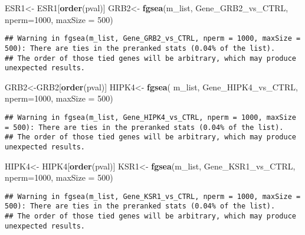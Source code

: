 \documentclass[]{article}
\newenvironment{Shaded}{\begin{snugshade}}{\end{snugshade}}
\newcommand{\KeywordTok}[1]{\textcolor[rgb]{0.13,0.29,0.53}{\textbf{#1}}}
\newcommand{\DataTypeTok}[1]{\textcolor[rgb]{0.13,0.29,0.53}{#1}}
\newcommand{\DecValTok}[1]{\textcolor[rgb]{0.00,0.00,0.81}{#1}}
\newcommand{\StringTok}[1]{\textcolor[rgb]{0.31,0.60,0.02}{#1}}
\newcommand{\NormalTok}[1]{#1}
\begin{document}
\begin{Shaded}
\begin{Highlighting}[]
\NormalTok{ESR1<-}\StringTok{ }\NormalTok{ESR1[}\KeywordTok{order}\NormalTok{(pval)]}
\NormalTok{GRB2<-}\StringTok{ }\KeywordTok{fgsea}\NormalTok{(m_list, Gene_GRB2_vs_CTRL, }\DataTypeTok{nperm=}\DecValTok{1000}\NormalTok{, }\DataTypeTok{maxSize =} \DecValTok{500}\NormalTok{)}
\end{Highlighting}
\end{Shaded}

\begin{verbatim}
## Warning in fgsea(m_list, Gene_GRB2_vs_CTRL, nperm = 1000, maxSize = 500): There are ties in the preranked stats (0.04% of the list).
## The order of those tied genes will be arbitrary, which may produce unexpected results.
\end{verbatim}

\begin{Shaded}
\begin{Highlighting}[]
\NormalTok{GRB2<-GRB2[}\KeywordTok{order}\NormalTok{(pval)]}
\NormalTok{HIPK4<-}\StringTok{ }\KeywordTok{fgsea}\NormalTok{( m_list, Gene_HIPK4_vs_CTRL, }\DataTypeTok{nperm=}\DecValTok{1000}\NormalTok{, }\DataTypeTok{maxSize =} \DecValTok{500}\NormalTok{)}
\end{Highlighting}
\end{Shaded}

\begin{verbatim}
## Warning in fgsea(m_list, Gene_HIPK4_vs_CTRL, nperm = 1000, maxSize = 500): There are ties in the preranked stats (0.04% of the list).
## The order of those tied genes will be arbitrary, which may produce unexpected results.
\end{verbatim}

\begin{Shaded}
\begin{Highlighting}[]
\NormalTok{HIPK4<-}\StringTok{ }\NormalTok{HIPK4[}\KeywordTok{order}\NormalTok{(pval)]}
\NormalTok{KSR1<-}\StringTok{ }\KeywordTok{fgsea}\NormalTok{(m_list, Gene_KSR1_vs_CTRL, }\DataTypeTok{nperm=}\DecValTok{1000}\NormalTok{, }\DataTypeTok{maxSize =} \DecValTok{500}\NormalTok{)}
\end{Highlighting}
\end{Shaded}

\begin{verbatim}
## Warning in fgsea(m_list, Gene_KSR1_vs_CTRL, nperm = 1000, maxSize = 500): There are ties in the preranked stats (0.04% of the list).
## The order of those tied genes will be arbitrary, which may produce unexpected results.
\end{verbatim}
\end{document}
